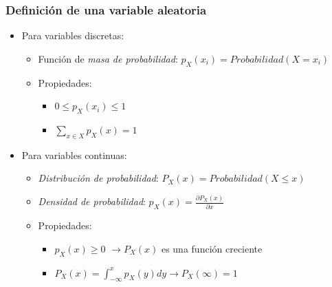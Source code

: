 \documentclass{beamer}
\numberwithin{section}{part}
\begin{document}
\begin{frame}\frametitle{Definición de una variable aleatoria}
  \begin{itemize}
    \item \alert{Para variables discretas:}
    \vspace{0.1cm}
    \begin{itemize}\footnotesize
      \item Función de \color{olivegreen}\emph{masa de probabilidad}: \color{blue}$p_X(x_i)=Probabilidad(X=x_i)$\color{black}
      \vspace{0.1cm}
      \item Propiedades:
      \begin{itemize}
        \item $0\le p_X(x_i)\le 1$
        \vspace{0.1cm}
        \item $\sum_{x\in X} p_X(x)=1$
      \end{itemize}
    \end{itemize}
    \vspace{0.2cm}
    \item \alert{Para variables continuas:}
    \vspace{0.1cm}
    \begin{itemize}\footnotesize
      \item \color{olivegreen}\emph{Distribución de probabilidad}: \color{blue}$P_X(x)=Probabilidad(X\le x)$\color{black}
      \vspace{0.1cm}
      \item \color{olivegreen}\emph{Densidad de probabilidad}: \color{blue}$p_X(x)=\frac{\partial P_X(x)}{\partial x}$\color{black}
      \vspace{0.1cm}
      \item Propiedades:
      \begin{itemize}
        \item $p_X(x)\ge 0$ $\rightarrow P_X(x)$ es una función creciente
        \vspace{0.1cm}
        \item $P_X(x)=\int_{-\infty}^x p_X(y)dy \rightarrow P_X(\infty)=1$
      \end{itemize}
    \end{itemize}
  \end{itemize}
\end{frame}
\end{document}

